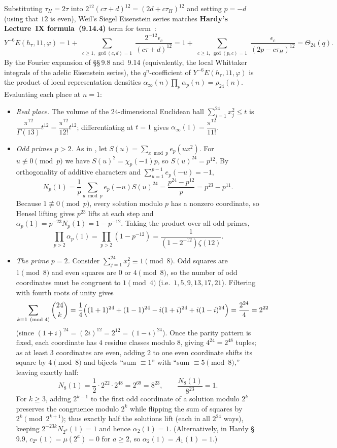 Substituting $\tau_H=2\tau$ into $2^{12}(c\tau+d)^{12}=(2d+c\tau_H)^{12}$ and setting $p=-d$ (using that $12$ is even), Weil's Siegel Eisenstein series matches \textbf{Hardy's Lecture~IX formula~(9.14.4)} term for term~\cite[p.~150]{Hardy1940}:
\[
Y^{-6}E(h_\tau,11,\varphi)
=1+\sum_{\substack{c\ge 1,\ \gcd(c,d)=1}}\frac{2^{-12}\epsilon_c}{(c\tau+d)^{12}}
=1+\sum_{\substack{c\ge 1,\ \gcd(p,c)=1}}\frac{\epsilon_c}{(2p-c\tau_H)^{12}}
=\Theta_{24}(q).
\]
By the Fourier expansion of \S\S\,9.8 and~9.14 (equivalently, the local Whittaker integrals of the adelic Eisenstein series), the $q^n$-coefficient of $Y^{-6}E(h_\tau,11,\varphi)$ is the product of local representation densities $\alpha_\infty(n)\prod_p\alpha_p(n)=\rho_{24}(n)$. Evaluating each place at $n=1$:
\begin{itemize}
\item \emph{Real place.} The volume of the $24$-dimensional Euclidean ball $\sum_{j=1}^{24}x_j^2\le t$ is $\dfrac{\pi^{12}}{\Gamma(13)}t^{12}=\dfrac{\pi^{12}}{12!}t^{12}$; differentiating at $t=1$ gives $\alpha_\infty(1)=\dfrac{\pi^{12}}{11!}$.
\item \emph{Odd primes $p>2$.} As in , let $S(u)=\sum_{x\bmod p}e_p(ux^2)$. For $u\not\equiv 0\pmod p$ we have $S(u)^2=\chi_p(-1)p$, so $S(u)^{24}=p^{12}$. By orthogonality of additive characters and $\sum_{u=1}^{p-1}e_p(-u)=-1$,
\[
N_p(1)=\frac{1}{p}\sum_{u\bmod p}e_p(-u)S(u)^{24}=\frac{p^{24}-p^{12}}{p}=p^{23}-p^{11}.
\]
Because $1\not\equiv 0\pmod p$, every solution modulo $p$ has a nonzero coordinate, so Hensel lifting gives $p^{23}$ lifts at each step and $\alpha_p(1)=p^{-23}N_p(1)=1-p^{-12}$. Taking the product over all odd primes,
\[
\prod_{p>2}\alpha_p(1)=\prod_{p>2}(1-p^{-12})=\frac{1}{(1-2^{-12})\zeta(12)}.
\]
\item \emph{The prime $p=2$.} Consider $\sum_{j=1}^{24}x_j^2\equiv 1\pmod 8$. Odd squares are $1\pmod 8$ and even squares are $0$ or $4\pmod 8$, so the number of odd coordinates must be congruent to $1\pmod 4$ (i.e.\ $1,5,9,13,17,21$). Filtering with fourth roots of unity gives
\[
\sum_{k\equiv 1\pmod 4}\binom{24}{k}=\frac{1}{4}\Bigl((1+1)^{24}+(1-1)^{24}-i(1+i)^{24}+i(1-i)^{24}\Bigr)=\frac{2^{24}}{4}=2^{22}
\]
(since $(1+i)^{24}=(2i)^{12}=2^{12}=(1-i)^{24}$). Once the parity pattern is fixed, each coordinate has $4$ residue classes modulo $8$, giving $4^{24}=2^{48}$ tuples; as at least $3$ coordinates are even, adding $2$ to one even coordinate shifts its square by $4\pmod 8$ and bijects ``sum $\equiv 1$'' with ``sum $\equiv 5\pmod 8$,'' leaving exactly half:
\[
N_8(1)=\frac{1}{2}\cdot 2^{22}\cdot 2^{48}=2^{69}=8^{23},\qquad \frac{N_8(1)}{8^{23}}=1.
\]
For $k\ge 3$, adding $2^{k-1}$ to the first odd coordinate of a solution modulo $2^k$ preserves the congruence modulo $2^k$ while flipping the sum of squares by $2^k\pmod{2^{k+1}}$; thus exactly half the solutions lift (each in all $2^{24}$ ways), keeping $2^{-23k}N_{2^k}(1)=1$ and hence $\alpha_2(1)=1$. (Alternatively, in Hardy \S\,9.9, $c_{2^a}(1)=\mu(2^a)=0$ for $a\ge 2$, so $\alpha_2(1)=A_1(1)=1$.)
\end{itemize}
